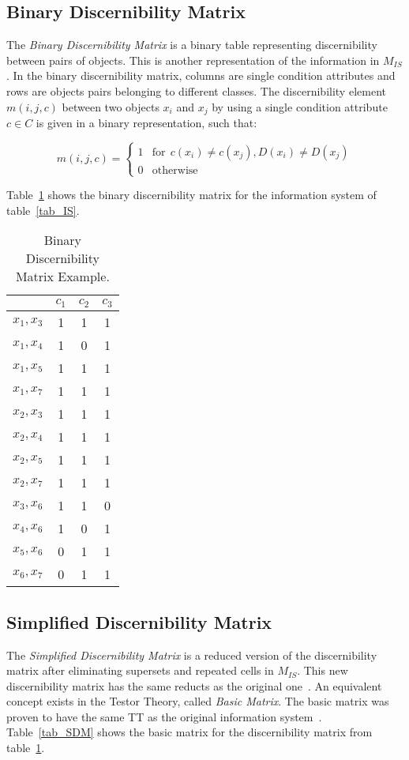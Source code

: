 \documentclass[authoryear,11pt]{elsarticle}
\begin{document}
\subsection{Binary Discernibility Matrix}
  The \textit{Binary Discernibility Matrix} is a binary table representing discernibility between pairs of 
  objects. This is another representation of the information in $M_{IS}$. In the binary discernibility
  matrix, columns are single condition attributes and rows are objects pairs belonging to different classes.
  The discernibility element $m(i, j, c)$ between two objects $x_i$ and $x_j$ by using a single condition 
  attribute $c \in C$ is given in a binary representation, such that:
  
  \begin{equation}
  	m(i, j, c)=\left\lbrace\begin{array}{cl}
  			1 & \mathrm{for~~}c(x_i) \neq c(x_j),D(x_i) \neq D(x_j)\\
  			0 								   & \mathrm{otherwise} 
  	\end{array}\right.
  \end{equation} 
  
  Table~\ref{tab_BDM} shows the binary discernibility matrix for the information system of table~\ref{tab_IS}.  
  
  \begin{table}[htb]
		\caption{Binary Discernibility Matrix Example.} \label{tab_BDM}
		\centering
 	\begin{tabular}{cccc}
 		& $c_1$ & $c_2$ & $c_3$\\
 		\hline
		$x_1,x_3$ & 1 & 1 & 1 \\
		$x_1,x_4$ & 1 & 0 & 1 \\
		$x_1,x_5$ & 1 & 1 & 1 \\
		$x_1,x_7$ & 1 & 1 & 1 \\
		$x_2,x_3$ & 1 & 1 & 1 \\
		$x_2,x_4$ & 1 & 1 & 1 \\
		$x_2,x_5$ & 1 & 1 & 1 \\
		$x_2,x_7$ & 1 & 1 & 1 \\
		$x_3,x_6$ & 1 & 1 & 0 \\
		$x_4,x_6$ & 1 & 0 & 1 \\
		$x_5,x_6$ & 0 & 1 & 1 \\
		$x_6,x_7$ & 0 & 1 & 1 
 	\end{tabular}             
  \end{table}
  
\subsection{Simplified Discernibility Matrix}
  The \textit{Simplified Discernibility Matrix} is a reduced version of the discernibility matrix after
  eliminating supersets and repeated cells in $M_{IS}$. This new discernibility matrix has the same reducts
  as the original one~\citep{Yao09}. An equivalent concept exists in the Testor Theory, called 
  \textit{Basic Matrix}. The basic matrix was proven to have the same TT as the original information
  system~\citep{Lazo01}. Table~\ref{tab_SDM} shows the basic matrix for the
  discernibility matrix from table~\ref{tab_BDM}.
  
\end{document}
